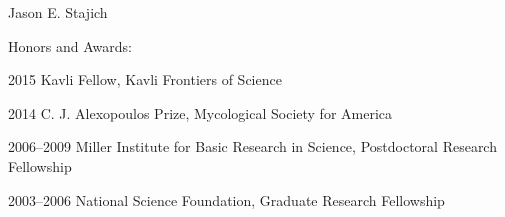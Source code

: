 \documentclass[10pt]{article}
\def\endthebibliography{\end{etaremune}}
\newlength{\oldcvlabelwidth}
\begin{document}
\begin{cv}{\centerline{Jason E. Stajich}}
\begin{cvlistcompact}{Honors and Awards:}
\item [2015] Kavli Fellow, Kavli Frontiers of Science
\item [2014] C. J. Alexopoulos Prize, Mycological Society for America
\item [2006--2009] Miller Institute for Basic Research in Science,
  Postdoctoral Research Fellowship
\item [2003--2006] National Science Foundation, Graduate Research Fellowship
\end{cvlistcompact}

\setlength{\oldcvlabelwidth}{\cvlabelwidth}
\setlength{\cvlabelwidth}{1em}
\renewcommand*{\bibindent}{1.5em}
\renewcommand*{\biblabelsep}{1.5em}


\makeatletter
\def\thebibliography#1{\list
{\arabic{enumiv}.}{\settowidth\labelwidth{[#1]}\leftmargin\labelwidth
\advance\leftmargin\labelsep
\usecounter{enumiv}}
\def\newblock{\hskip .11em plus .33em minus .07em}
\sloppy\clubpenalty4000\widowpenalty4000
\sfcode`\.=1000\relax
}
\let\endthebibliography=\endlist
\makeatother


\end{cv}
\end{document}
